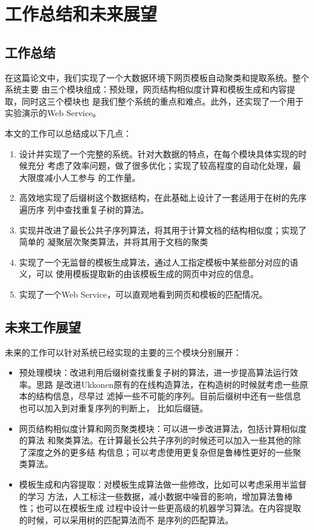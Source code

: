 
\chapter{工作总结和未来展望}
\label{chap:future}
\section{工作总结}
\label{sec:summaryall}
在这篇论文中，我们实现了一个大数据环境下网页模板自动聚类和提取系统。整个系统主要
由三个模块组成：预处理，网页结构相似度计算和模板生成和内容提取，同时这三个模块也
是我们整个系统的重点和难点。此外，还实现了一个用于实验演示的Web Service。

本文的工作可以总结成以下几点：
\begin{enumerate}
\item 设计并实现了一个完整的系统。针对大数据的特点，在每个模块具体实现的时候充分
  考虑了效率问题，做了很多优化；实现了较高程度的自动化处理，最大限度减小人工参与
  的工作量。
\item 高效地实现了后缀树这个数据结构，在此基础上设计了一套适用于在树的先序遍历序
  列中查找重复子树的算法。
\item 实现并改进了最长公共子序列算法，将其用于计算文档的结构相似度；实现了简单的
  凝聚层次聚类算法，并将其用于文档的聚类
\item 实现了一个无监督的模板生成算法，通过人工指定模板中某些部分对应的语义，可以
  使用模板提取新的由该模板生成的网页中对应的信息。
\item 实现了一个Web Service，可以直观地看到网页和模板的匹配情况。
\end{enumerate}
\section{未来工作展望}
\label{sec:futurework}
未来的工作可以针对系统已经实现的主要的三个模块分别展开：
\begin{itemize}
\item 预处理模块：改进利用后缀树查找重复子树的算法，进一步提高算法运行效率。思路
  是改进Ukkonen原有的在线构造算法，在构造树的时候就考虑一些原本的结构信息，尽早过
  滤掉一些不可能的序列。目前后缀树中还有一些信息也可以加入到对重复序列的判断上，
  比如后缀链。
\item 网页结构相似度计算和网页聚类模块：可以进一步改进算法，包括计算相似度的算法
  和聚类算法。在计算最长公共子序列的时候还可以加入一些其他的除了深度之外的更多结
  构信息；可以考虑使用更复杂但是鲁棒性更好的一些聚类算法。
\item 模板生成和内容提取：对模板生成算法做一些修改，比如可以考虑采用半监督的学习
  方法，人工标注一些数据，减小数据中噪音的影响，增加算法鲁棒性；也可以在模板生成
  过程中设计一些更高级的机器学习算法。在内容提取的时候，可以采用树的匹配算法而不
  是序列的匹配算法。
\end{itemize}
